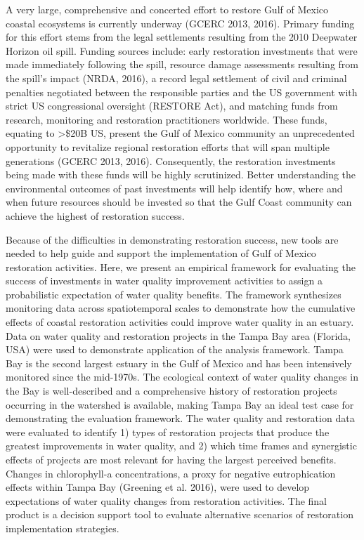\documentclass[]{article}
\begin{document}
A very large, comprehensive and concerted effort to restore Gulf of
Mexico coastal ecosystems is currently underway (GCERC 2013, 2016).
Primary funding for this effort stems from the legal settlements
resulting from the 2010 Deepwater Horizon oil spill. Funding sources
include: early restoration investments that were made immediately
following the spill, resource damage assessments resulting from the
spill's impact (NRDA, 2016), a record legal settlement of civil and
criminal penalties negotiated between the responsible parties and the US
government with strict US congressional oversight (RESTORE Act), and
matching funds from research, monitoring and restoration practitioners
worldwide. These funds, equating to \textgreater{}\$20B US, present the
Gulf of Mexico community an unprecedented opportunity to revitalize
regional restoration efforts that will span multiple generations (GCERC
2013, 2016). Consequently, the restoration investments being made with
these funds will be highly scrutinized. Better understanding the
environmental outcomes of past investments will help identify how, where
and when future resources should be invested so that the Gulf Coast
community can achieve the highest of restoration success.

Because of the difficulties in demonstrating restoration success, new
tools are needed to help guide and support the implementation of Gulf of
Mexico restoration activities. Here, we present an empirical framework
for evaluating the success of investments in water quality improvement
activities to assign a probabilistic expectation of water quality
benefits. The framework synthesizes monitoring data across
spatiotemporal scales to demonstrate how the cumulative effects of
coastal restoration activities could improve water quality in an
estuary. Data on water quality and restoration projects in the Tampa Bay
area (Florida, USA) were used to demonstrate application of the analysis
framework. Tampa Bay is the second largest estuary in the Gulf of Mexico
and has been intensively monitored since the mid-1970s. The ecological
context of water quality changes in the Bay is well-described and a
comprehensive history of restoration projects occurring in the watershed
is available, making Tampa Bay an ideal test case for demonstrating the
evaluation framework. The water quality and restoration data were
evaluated to identify 1) types of restoration projects that produce the
greatest improvements in water quality, and 2) which time frames and
synergistic effects of projects are most relevant for having the largest
perceived benefits. Changes in chlorophyll-a concentrations, a proxy for
negative eutrophication effects within Tampa Bay (Greening et al. 2016),
were used to develop expectations of water quality changes from
restoration activities. The final product is a decision support tool to
evaluate alternative scenarios of restoration implementation strategies.
\end{document}
